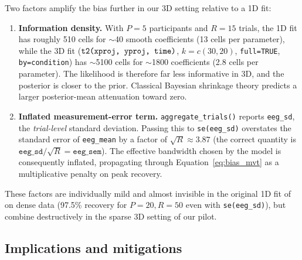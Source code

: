 \documentclass[12pt, a4paper]{article}
\begin{document}
Two factors amplify the bias further in our 3D setting relative to a 1D
fit:
\begin{enumerate}
  \item \textbf{Information density.} With $P=5$ participants and
        $R=15$ trials, the 1D fit has roughly 510 cells for $\sim$40 smooth
        coefficients (13 cells per parameter), while the 3D fit
        ($\verb|t2(xproj, yproj, time)|$, $k=c(30,20)$, \texttt{full=TRUE},
        \verb|by=condition|) has $\sim$5100 cells for $\sim$1800 coefficients
        (2.8 cells per parameter). The likelihood is therefore far less
        informative in 3D, and the posterior is closer to the prior. Classical
        Bayesian shrinkage theory \citep{LindleySmith1972,Efron1971} predicts
        a larger posterior-mean attenuation toward zero.
  \item \textbf{Inflated measurement-error term.}
        \texttt{aggregate\_trials()} reports \texttt{eeg\_sd}, the
        \emph{trial-level} standard deviation. Passing this to
        \verb|se(eeg_sd)| overstates the standard error of \texttt{eeg\_mean}
        by a factor of $\sqrt{R}\approx 3.87$ (the correct quantity is
        $\texttt{eeg\_sd}/\sqrt{R} = \texttt{eeg\_sem}$). The effective
        bandwidth chosen by the model is consequently inflated, propagating
        through Equation~\eqref{eq:bias_mvt} as a multiplicative penalty on
        peak recovery.
\end{enumerate}

These factors are individually mild and almost invisible in the original 1D
fit of \citet{Nalborczyk2025} on dense data (97.5\% recovery for
$P=20, R=50$ even with \verb|se(eeg_sd)|), but combine destructively in the
sparse 3D setting of our pilot.

\subsection{Implications and mitigations}\label{sec:amp_mitigation}
\end{document}
